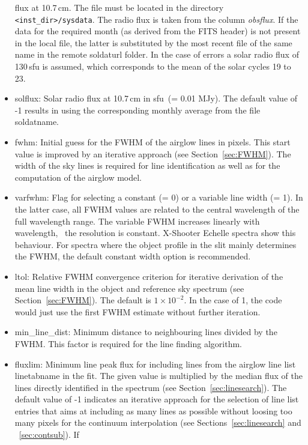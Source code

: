 \begin{itemize}
flux at 10.7\,cm. The file must be located in the directory
{\tt <inst\_dir>/sysdata}. The radio flux is taken from the column
{\it obsflux}. If the data for the required month (as derived from the
\ac{FITS} header) is not present in the local file, the latter is substituted
by the most recent file of the same name in the remote {\sc soldaturl} folder.
In the case of errors a solar radio flux of 130\,sfu is assumed, which
corresponds to the mean of the solar cycles 19 to 23.
\item {\sc solflux}: Solar radio flux at 10.7\,cm in sfu~(= 0.01 MJy). The
default value of -1 results in using the corresponding monthly average from the
file {\sc soldatname}.
\item {\sc fwhm}: Initial guess for the FWHM of the airglow lines in pixels.
This start value is improved by an iterative approach (see
Section~\ref{sec:FWHM}). The width of the sky lines is required for line
identification as well as for the computation of the airglow model.
\item {\sc varfwhm}: Flag for selecting a constant (= 0) or a variable line
width (= 1). In the latter case, all FWHM values are related to the central
wavelength of the full wavelength range. The variable FWHM increases linearly
with wavelength, \ie\ the resolution is constant. X-Shooter Echelle spectra
show this behaviour. For spectra where the object profile in the slit mainly
determines the FWHM, the default constant width option is recommended.
\item {\sc ltol}: Relative FWHM convergence criterion for iterative derivation
of the mean line width in the object and reference sky spectrum (see
Section~\ref{sec:FWHM}). The default is $1 \times 10^{-2}$. In the case of 1,
the code would just use the first FWHM estimate without further iteration.
\item {\sc min\_line\_dist}: Minimum distance to neighbouring lines divided by
the FWHM. This factor is required for the line finding algorithm.
\item {\sc fluxlim}: Minimum line peak flux for including lines from the
airglow line list {\sc linetabname} in the fit. The given value is multiplied
by the median flux of the lines directly identified in the spectrum (see
Section~\ref{sec:linesearch}). The default value of -1 indicates an iterative
approach for the selection of line list entries that aims at including as
many lines as possible without loosing too many pixels for the continuum
interpolation (see Sections~\ref{sec:linesearch} and ~\ref{sec:contsub}). If

\end{itemize}
